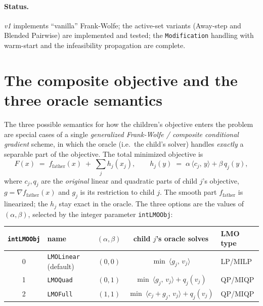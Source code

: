 \documentclass[11pt,a4paper]{article}
\newcommand{\ip}[2]{\langle #1,\, #2\rangle}
\newcommand{\ffat}{f_{\mathrm{father}}}
\newcommand{\code}[1]{\texttt{#1}}
\theoremstyle{plain}
\theoremstyle{remark}
\begin{document}
\paragraph{Status.} \emph{v1} implements ``vanilla'' Frank-Wolfe; the active-set
variants (Away-step and Blended Pairwise) are implemented and tested; the
\code{Modification} handling with warm-start and the infeasibility propagation are
complete.

\section{The composite objective and the three oracle semantics}\label{sec:composite}

The three possible semantics for how the children's objective enters the problem
are special cases of a single \emph{generalized Frank-Wolfe / composite
conditional gradient} scheme, in which the oracle (i.e.\ the child's solver)
handles \emph{exactly} a separable part of the objective. The total minimized
objective is
\begin{equation}\label{eq:F}
  F(x) \;=\; \ffat(x) \;+\; \sum_{j} h_j(x_j), \qquad
  h_j(y) \;=\; \alpha\,\ip{c_j}{y} + \beta\,q_j(y),
\end{equation}
where $c_j,q_j$ are the \emph{original} linear and quadratic parts of child $j$'s
objective, $g=\nabla \ffat(x)$ and $g_j$ is its restriction to child $j$. The
smooth part $\ffat$ is linearized; the $h_j$ stay exact in the oracle. The three
options are the values of $(\alpha,\beta)$, selected by the integer parameter
\code{intLMOObj}:

\begin{center}
\begin{tabular}{@{}clccl@{}}
\toprule
\code{intLMOObj} & name & $(\alpha,\beta)$ & child $j$'s oracle solves & LMO type\\
\midrule
0 & \code{LMOLinear} (default) & $(0,0)$ & $\min\ \ip{g_j}{v_j}$ & LP/MILP\\
1 & \code{LMOQuad}             & $(0,1)$ & $\min\ \ip{g_j}{v_j} + q_j(v_j)$ & QP/MIQP\\
2 & \code{LMOFull}             & $(1,1)$ & $\min\ \ip{c_j+g_j}{v_j} + q_j(v_j)$ & QP/MIQP\\
\bottomrule
\end{tabular}
\end{center}
\end{document}
